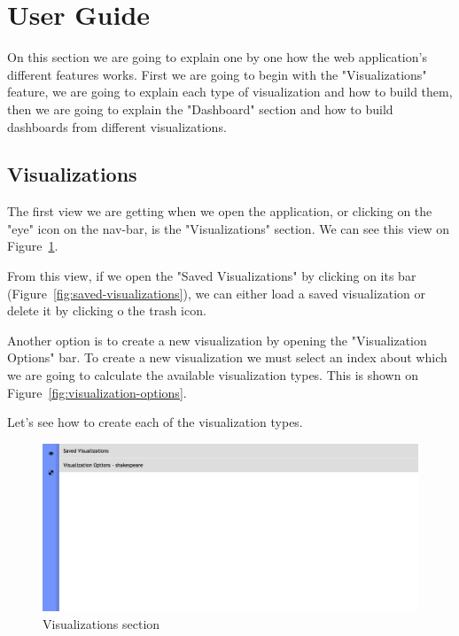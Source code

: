 \documentclass[a4paper, 12pt, english]{book}
\begin{document}
\section{User Guide}
\label{sec:results-user-guide}
On this section we are going to explain one by one how the web application's different features works. First we are going to begin with the "Visualizations" feature, we are going to explain each type of visualization and how to build them, then we are going to explain the "Dashboard" section and how to build dashboards from different visualizations.

\subsection{Visualizations}
\label{sec:results-visualizations}
The first view we are getting when we open the application, or clicking on the "eye" icon on the nav-bar, is the "Visualizations" section. We can see this view on Figure~\ref{fig:visualizations-section}.

From this view, if we open the "Saved Visualizations" by clicking on its bar (Figure~\ref{fig:saved-visualizations}),  we can either load a saved visualization or delete it by clicking o the trash icon.

Another option is to create a new visualization by opening the "Visualization Options" bar. To create a new visualization we must select an index about which we are going to calculate the available visualization types. This is shown on Figure~\ref{fig:visualization-options}.

Let's see how to create each of the visualization types.

\begin{figure}
  \centering
  \includegraphics[width=13cm, keepaspectratio]{img/visualizations-section}
  \caption{Visualizations section}
  \label{fig:visualizations-section}
\end{figure}
\end{document}

